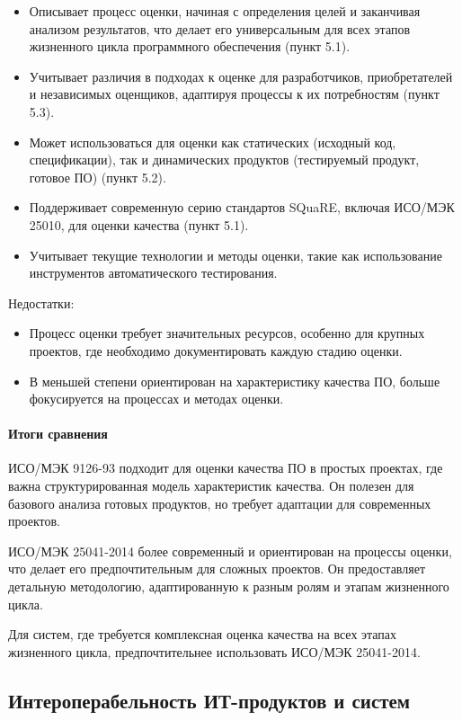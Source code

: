 \begin{itemize}
	\item Описывает процесс оценки, начиная с определения целей
		и заканчивая анализом результатов, что делает его универсальным
		для всех этапов жизненного цикла программного обеспечения (пункт 5.1).
	\item Учитывает различия в подходах к оценке для разработчиков,
		приобретателей и независимых оценщиков,
		адаптируя процессы к их потребностям (пункт 5.3).
	\item Может использоваться для оценки как статических
		(исходный код, спецификации),
		так и динамических продуктов
		(тестируемый продукт, готовое ПО) (пункт 5.2).
	\item Поддерживает современную серию стандартов SQuaRE,
		включая ИСО/МЭК 25010, для оценки качества (пункт 5.1).
	\item Учитывает текущие технологии и методы оценки,
		такие как использование инструментов автоматического тестирования.
\end{itemize}

Недостатки:

\begin{itemize}
	\item Процесс оценки требует значительных ресурсов,
		особенно для крупных проектов,
		где необходимо документировать каждую стадию оценки.
	\item В меньшей степени ориентирован на характеристику качества ПО,
		больше фокусируется на процессах и методах оценки.
\end{itemize}

\paragraph{Итоги сравнения}

ИСО/МЭК 9126-93 подходит для оценки качества ПО в простых проектах,
где важна структурированная модель характеристик качества.
Он полезен для базового анализа готовых продуктов,
но требует адаптации для современных проектов.

ИСО/МЭК 25041-2014 более современный и ориентирован на процессы оценки,
что делает его предпочтительным для сложных проектов.
Он предоставляет детальную методологию,
адаптированную к разным ролям и этапам жизненного цикла.

Для систем,
где требуется комплексная оценка качества на всех этапах жизненного цикла,
предпочтительнее использовать ИСО/МЭК 25041-2014.

\subsection{Интероперабельность ИТ-продуктов и систем}

